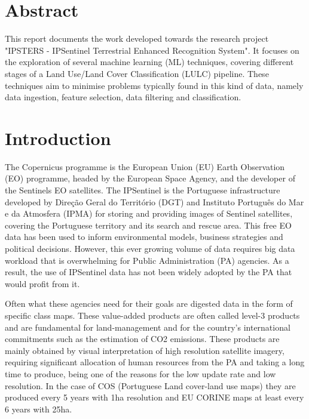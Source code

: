 \documentclass[12pt, english, openany]{book}
\begin{document}
\chapter*{Abstract}

This report documents the work developed towards the research project "IPSTERS
- IPSentinel Terrestrial Enhanced Recognition System". It focuses on the
exploration of several machine learning (ML) techniques, covering different
stages of a Land Use/Land Cover Classification (LULC) pipeline. These
techniques aim to minimise problems typically found in this kind of data,
namely data ingestion, feature selection, data filtering and classification.



\tableofcontents{}

\clearpage

\listoffigures

\clearpage

\listoftables

\mainmatter

\chapter{Introduction}

The Copernicus programme is the European Union (EU) Earth Observation (EO)
programme, headed by the European Space Agency, and the developer of the
Sentinels EO satellites. The IPSentinel is the Portuguese infrastructure
developed by Direção Geral do Território (DGT) and Instituto Português do Mar e
da Atmosfera (IPMA) for storing and providing images of Sentinel satellites,
covering the Portuguese territory and its search and rescue area. This free EO
data has been used to inform environmental models, business strategies and
political decisions. However, this ever growing volume of data requires big
data workload that is overwhelming for Public Administration (PA) agencies. As
a result, the use of IPSentinel data has not been widely adopted by the PA that
would profit from it.

Often what these agencies need for their goals are digested data in the form of
specific class maps. These value-added products are often called level-3
products and are fundamental for land-management and for the country's
international commitments such as the estimation of CO2 emissions. These
products are mainly obtained by visual interpretation of high resolution
satellite imagery, requiring significant allocation of human resources from the
PA and taking a long time to produce, being one of the reasons for the low
update rate and low resolution. In the case of COS (Portuguese Land cover-land
use maps) they are produced every 5 years with 1ha resolution and EU CORINE
maps at least every 6 years with 25ha.
\end{document}
